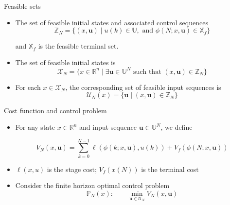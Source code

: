 \documentclass{beamer}
\newcommand{\bbR}{\mathbb{R}}
\newcommand{\bbX}{\mathbb{X}}
\newcommand{\bbU}{\mathbb{U}}
\newcommand{\bbI}{\mathbb{I}}
\newcommand{\bbZ}{\mathbb{Z}}
\newcommand{\bbP}{\mathbb{P}}
\newcommand{\useq}{\mathbf{u}}
\newcommand{\mc}{\mathcal}
\begin{document}
\begin{frame}{Feasible sets}

\begin{itemize}

\item The set of feasible initial states and associated
control sequences
\begin{equation*}
\bbZ_N = \{ (x,\useq) \mid u(k) \in \bbU , %
\text{ and } \phi(N; x,\useq) \in \bbX_f \}
\end{equation*}

and $\bbX_f$ is the feasible terminal set.

\item The set of feasible initial states is
\begin{equation}
\mc{X}_N = \{ x \in \bbR^n \mid \exists \useq \in \bbU^N \text{ such that } (x,\useq) \in \bbZ_N \}
\label{eq:feasibleset}
\end{equation}

\item For each $x\in\mc{X}_N$, the corresponding set of feasible input
sequences is
\begin{equation*}
 \mc{U}_N (x) = \{ \useq \mid (x,\useq) \in \bbZ_N \} 
\end{equation*}
\end{itemize}
\end{frame}

\begin{frame}{Cost function and control problem}
\begin{itemize}
\item For any state $x \in \bbR^n$ and input sequence $\useq \in \bbU^N$, we define%

\begin{equation*}
V_N(x,\useq) = \sum_{k=0}^{N-1} \ell (\phi(k;x,\useq),u(k)) + V_f (\phi(N;x,\useq))
\end{equation*}

\item $\ell(x,u)$ is the stage cost; $V_f(x(N))$ is the terminal cost

\item Consider the finite horizon optimal control problem
\begin{equation*}
\bbP_N (x): \qquad \min_{\useq \in \mc{U}_N} V_N(x,\useq) 
\end{equation*}
\end{itemize}
\end{frame}
\end{document}
